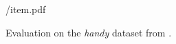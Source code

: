 \begin{figure}[b]
\centering
\begin{overpic} 
[width=\linewidth,height=1.5in]
{\currfiledir/item.pdf}
\myfigurename{}
\end{overpic}
\caption{
% 
Evaluation on the \emph{handy} dataset from \protect\cite{tkach2016sphere}.
% 
}
\label{fig:evalhandy}
\end{figure}
